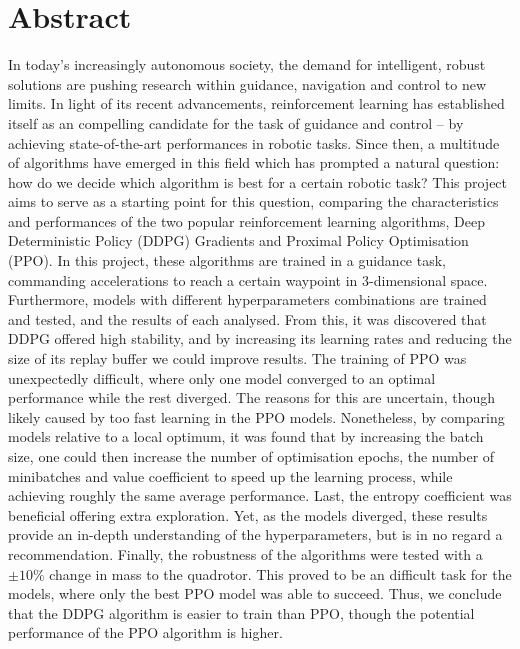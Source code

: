 \chapter*{Abstract}

\begin{comment}
A condensation of the essential information of the article.
\end{comment}

In today's increasingly autonomous society, the demand for intelligent, robust solutions are pushing research within guidance, navigation and control to new limits.
In light of its recent advancements, reinforcement learning has established itself as an compelling candidate for the task of guidance and control -- by achieving state-of-the-art performances in robotic tasks. 
Since then, a multitude of algorithms have emerged in this field which has prompted a natural question: how do we decide which algorithm is best for a certain robotic task?
This project aims to serve as a starting point for this question, comparing the characteristics and performances of the two popular reinforcement learning algorithms, Deep Deterministic Policy (DDPG) Gradients and Proximal Policy Optimisation (PPO). 
In this project, these algorithms are trained in a guidance task, commanding accelerations to reach a certain waypoint in 3-dimensional space. Furthermore, models with different hyperparameters combinations are trained and tested, and the results of each analysed. From this, it was discovered that DDPG offered high stability, and by increasing its learning rates and reducing the size of its replay buffer we could improve results. The training of PPO was unexpectedly difficult, where only one model converged to an optimal performance while the rest diverged. The reasons for this are uncertain, though likely caused by too fast learning in the PPO models. Nonetheless, by comparing models relative to a local optimum, it was found that by increasing the batch size, one could then increase the number of optimisation epochs, the number of minibatches and value coefficient to speed up the learning process, while achieving roughly the same average performance. Last, the entropy coefficient was beneficial offering extra exploration. Yet, as the models diverged, these results provide an in-depth understanding of the hyperparameters, but is in no regard a recommendation. Finally, the robustness of the algorithms were tested with a $\pm10\%$ change in mass to the quadrotor. This proved to be an difficult task for the models, where only the best PPO model was able to succeed. Thus, we conclude that the DDPG algorithm is easier to train than PPO, though the potential performance of the PPO algorithm is higher.